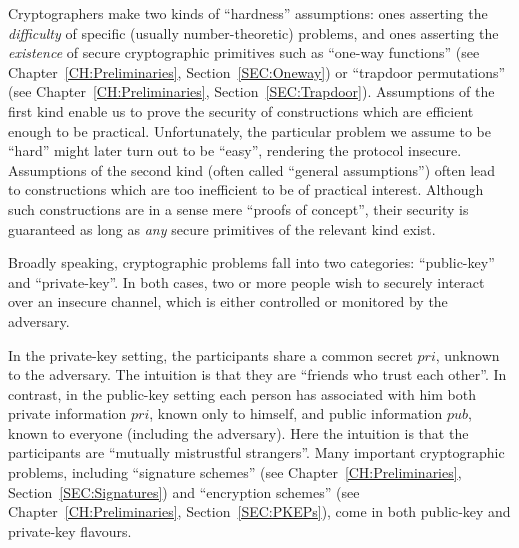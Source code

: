 
Cryptographers make two kinds of ``hardness'' assumptions: ones asserting the
{\it difficulty} of specific (usually number-theoretic) problems, and ones
asserting the {\it existence} of secure cryptographic primitives such as
``one-way functions'' (see Chapter~\ref{CH:Preliminaries},
Section~\ref{SEC:Oneway}) or ``trapdoor permutations'' (see
Chapter~\ref{CH:Preliminaries}, Section~\ref{SEC:Trapdoor}).  Assumptions of
the first kind enable us to prove the security of constructions which are
efficient enough to be practical.  Unfortunately, the particular problem we
assume to be ``hard'' might later turn out to be ``easy'', 
rendering the protocol insecure.  Assumptions of the second kind (often called
``general assumptions'')
often lead to constructions which are too inefficient to be of practical
interest.  Although such constructions are in a sense mere ``proofs of
concept'', their security is guaranteed as long as {\it any} secure primitives
of the relevant kind exist. 

Broadly speaking, cryptographic problems fall into two categories:
``public-key'' and ``private-key''. In both cases, two or more people wish to
securely interact over an insecure channel, which is either controlled or
monitored by the adversary.  

In the private-key setting, the participants share a common secret $pri$,
unknown to the adversary. The intuition is that they are ``friends who trust
each other''. In contrast, in the public-key setting each person has
associated with him both private information $pri$, known only to himself, and
public information $pub$, known to everyone (including the adversary). Here
the intuition is that the participants are ``mutually mistrustful strangers''.
Many important cryptographic problems, including ``signature schemes'' (see
Chapter~\ref{CH:Preliminaries}, Section~\ref{SEC:Signatures}) and ``encryption
schemes'' (see Chapter~\ref{CH:Preliminaries}, Section~\ref{SEC:PKEPs}), come
in both public-key and private-key flavours. 

